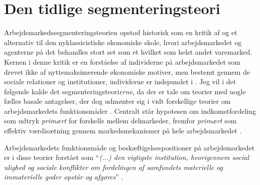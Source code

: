 \section{Den tidlige segmenteringsteori \label{AST_overordnet}}

Arbejdsmarkedssegmenteringsteorien opstod historisk som en kritik af og et alternativ til den nyklassicistiske økonomiske skole, hvori arbejdsmarkedet og agenterne på det behandles stort set som et hvilket som helst andet varemarked. Kernen i denne kritik er en forståelse af individerne på arbejdsmarkedet som drevet ikke af nyttemaksimerende økonomiske motiver, men bestemt gennem de sociale relationer og institutioner, individerne er indspundet i \parencite[173]{Boje1986}. Jeg vil i det følgende kalde det segmenteringsteori\emph{erne}, da der er tale om teorier med nogle fælles basale antagelser, der dog udmønter sig i vidt forskellige teorier om arbejdsmarkedets funktionsmåder \parencite[177]{Edwards1979}.  Centralt står hypotesen om indkomstfordeling som udtryk \emph{primært} for forskelle mellem delmarkeder, fremfor \emph{primært} som effektiv værdisætning gennem markedsmekanismer på hele arbejdsmarkedet \parencite[78]{BojeToft1989}.

Arbejdsmarkedets funktionsmåde og beskæftigelsespositioner på arbejdsmarkedet er i disse teorier forstået som “\emph{(...) den vigtigste institution, hvorigennem social ulighed og sociale konflikter om fordelingen af samfundets materielle og immaterielle goder opstår og afgøres}” \parencite[10]{Boje1985}. 


